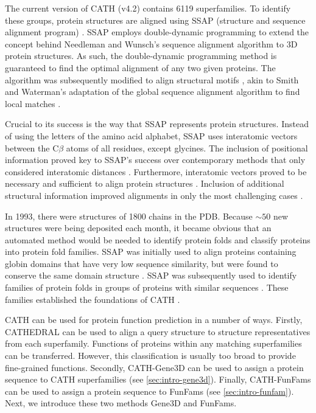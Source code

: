 The current version of CATH (v4.2) contains \num{6119} superfamilies. To identify these groups, protein structures are aligned using SSAP (structure and sequence alignment program) \cite{Taylor1989}. SSAP employs double-dynamic programming to extend the concept behind Needleman and Wunsch's sequence alignment algorithm \cite{Needleman1970} to 3D protein structures. As such, the double-dynamic programming method is guaranteed to find the optimal alignment of any two given proteins. The algorithm was subsequently modified to align structural motifs \cite{Orengo1993}, akin to Smith and Waterman's adaptation of the global sequence alignment algorithm to find local matches \cite{Smith1981}.

Crucial to its success is the way that SSAP represents protein structures. Instead of using the letters of the amino acid alphabet, SSAP uses interatomic vectors between the C$\beta$ atoms of all residues, except glycines. The inclusion of positional information proved key to SSAP's success over contemporary methods that only considered interatomic distances \cite{Orengo1996}. Furthermore, interatomic vectors proved to be necessary and sufficient to align protein structures \cite{Taylor1989a}. Inclusion of additional structural information improved alignments in only the most challenging cases \cite{Taylor1989a}.

In 1993, there were structures of \num{1800} chains in the PDB. Because $\sim 50$ new structures were being deposited each month, it became obvious that an automated method would be needed to identify protein folds and classify proteins into protein fold families. SSAP was initially used to align proteins containing globin domains that have very low sequence similarity, but were found to conserve the same domain structure \cite{Taylor1989}. SSAP was subsequently used to identify families of protein folds in groups of proteins with similar sequences \cite{Orengo1993a}. These families established the foundations of CATH \cite{Orengo1999,Orengo1997}.

CATH can be used for protein function prediction in a number of ways. Firstly, CATHEDRAL \cite{Redfern2007} can be used to align a query structure to structure representatives from each superfamily. Functions of proteins within any matching superfamilies can be transferred. However, this classification is usually too broad to provide fine-grained functions. Secondly, CATH-Gene$3$D can be used to assign a protein sequence to CATH superfamilies (see \ref{sec:intro-gene3d}). Finally, CATH-FunFams can be used to assign a protein sequence to FunFams (see \ref{sec:intro-funfam}). Next, we introduce these two methods Gene$3$D and FunFams.

